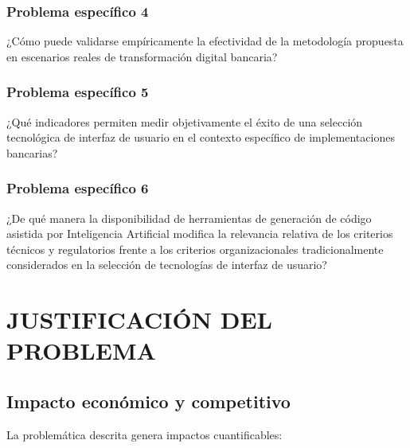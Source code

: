 \subsubsection{Problema específico 4}

¿Cómo puede validarse empíricamente la efectividad de la metodología
        propuesta en escenarios reales de transformación digital bancaria?

\subsubsection{Problema específico 5}

¿Qué indicadores permiten medir objetivamente el éxito de una
        selección tecnológica de interfaz de usuario en el contexto específico
        de implementaciones bancarias?

\subsubsection{Problema específico 6}

¿De qué manera la disponibilidad de herramientas de generación de
        código asistida por Inteligencia Artificial modifica la relevancia
        relativa de los criterios técnicos y regulatorios frente a los
        criterios organizacionales tradicionalmente considerados en la
        selección de tecnologías de interfaz de usuario?

\section{JUSTIFICACIÓN DEL PROBLEMA}

\subsection*{Impacto económico y competitivo}

La problemática descrita genera impactos cuantificables:

